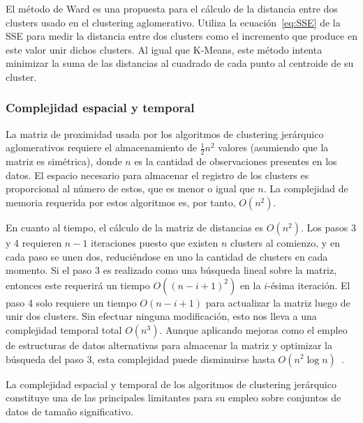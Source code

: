 El método de Ward es una propuesta para el cálculo de la distancia entre dos clusters usado en el clustering aglomerativo.
Utiliza la ecuación~\ref{eq:SSE} de la SSE para medir la distancia entre dos clusters como el incremento que produce en este valor unir dichos clusters.
Al igual que K-Means, este método intenta minimizar la suma de las distancias al cuadrado de cada punto al centroide de su cluster.

\subsubsection{Complejidad espacial y temporal}

La matriz de proximidad usada por los algoritmos de clustering jerárquico aglomerativos requiere el almacenamiento de $\frac{1}{2}n^2$ valores (asumiendo que la matriz es simétrica), donde $n$ es la cantidad de observaciones presentes en los datos.
El espacio necesario para almacenar el registro de los clusters es proporcional al número de estos, que es menor o igual que $n$.
La complejidad de memoria requerida por estos algoritmos es, por tanto, $O(n^2)$.

En cuanto al tiempo, el cálculo de la matriz de distancias es $O(n^2)$.
Los pasos 3 y 4 requieren $n-1$ iteraciones puesto que existen $n$ clusters al comienzo, y en cada paso se unen dos, reduciéndose en uno la cantidad de clusters en cada momento.
Si el paso 3 es realizado como una búsqueda lineal sobre la matriz, entonces este requerirá un tiempo $O((n-i+1)^2)$ en la $i$-ésima iteración.
El paso 4 solo requiere un tiempo $O(n-i+1)$ para actualizar la matriz luego de unir dos clusters.
Sin efectuar ninguna modificación, esto nos lleva a una complejidad temporal total $O(n^3)$.
Aunque aplicando mejoras como el empleo de estructuras de datos alternativas para almacenar la matriz y optimizar la búsqueda del paso 3, esta complejidad puede disminuirse hasta $O(n^2\log{n})$~\cite{Tan05}.

La complejidad espacial y temporal de los algoritmos de clustering jerárquico constituye una de las principales limitantes para su empleo sobre conjuntos de datos de tamaño significativo.